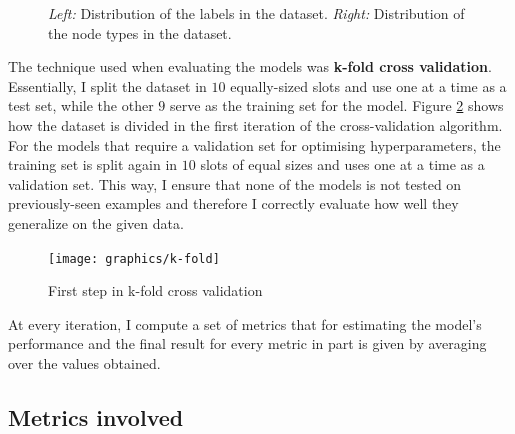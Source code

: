 \begin{figure}[H]
\begin{subfigure}{.4\textwidth}
			\end{subfigure}
			\caption[Distributions of labels and node type in the dataset]{\textit{Left:} Distribution of the labels in the dataset. \textit{Right: }Distribution of the node types in the dataset.}
			\label{Fig: eval/ml/methodology/dist}
		\end{figure} 
		The technique used when evaluating the models was \textbf{k-fold cross validation}. Essentially, I split the dataset in $10$ equally-sized slots and use one at a time as a test set, while the other $9$ serve as the training set for the model. Figure \ref{Fig: impl/ml/methodology/kfold/first} shows how the dataset is divided in the first iteration of the cross-validation algorithm. For the models that require a validation set for optimising hyperparameters, the training set is split again in $10$ slots of equal sizes and uses one at a time as a validation set. This way, I ensure that none of the models is not tested on previously-seen examples and therefore I correctly evaluate how well they generalize on the given data.
		\begin{figure}[H]
			\centering
			\texttt{[image: graphics/k-fold]}
			\caption{First step in k-fold cross validation}
			\label{Fig: impl/ml/methodology/kfold/first}
		\end{figure}
		
		At every iteration, I compute a set of metrics that for estimating the model's performance and the final result for every metric in part is given by averaging over the values obtained. 
	\subsection{Metrics involved} \label{Section: eval/ml/metrics}
	
